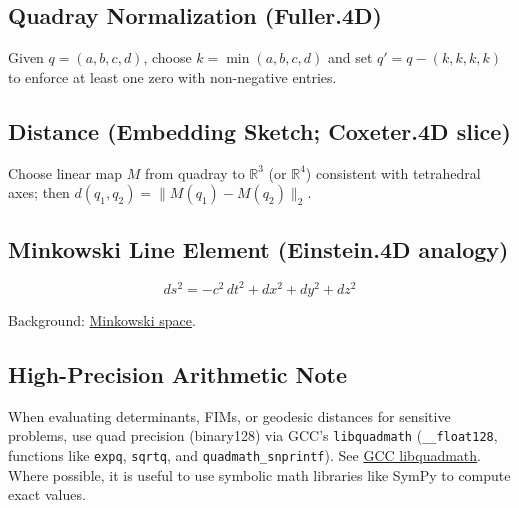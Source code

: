 \documentclass[
  10pt,
]{article}
\begin{document}
\hypertarget{quadray-normalization-fuller.4d}{%
\subsection{Quadray Normalization
(Fuller.4D)}\label{quadray-normalization-fuller.4d}}

Given \(q=(a,b,c,d)\), choose \(k=\min(a,b,c,d)\) and set
\(q' = q - (k,k,k,k)\) to enforce at least one zero with non-negative
entries.

\hypertarget{distance-embedding-sketch-coxeter.4d-slice}{%
\subsection{Distance (Embedding Sketch; Coxeter.4D
slice)}\label{distance-embedding-sketch-coxeter.4d-slice}}

Choose linear map \(M\) from quadray to \(\mathbb{R}^3\) (or
\(\mathbb{R}^4\)) consistent with tetrahedral axes; then
\(d(q_1,q_2) = \lVert M(q_1) - M(q_2) \rVert_2\).

\hypertarget{minkowski-line-element-einstein.4d-analogy}{%
\subsection{Minkowski Line Element (Einstein.4D
analogy)}\label{minkowski-line-element-einstein.4d-analogy}}

\begin{equation}\label{eq:supp_minkowski}
ds^2 = -c^2\,dt^2 + dx^2 + dy^2 + dz^2
\end{equation}

Background:
\href{https://en.wikipedia.org/wiki/Minkowski_space}{Minkowski space}.

\hypertarget{high-precision-arithmetic-note}{%
\subsection{High-Precision Arithmetic
Note}\label{high-precision-arithmetic-note}}

When evaluating determinants, FIMs, or geodesic distances for sensitive
problems, use quad precision (binary128) via GCC's \texttt{libquadmath}
(\texttt{\_\_float128}, functions like \texttt{expq}, \texttt{sqrtq},
and \texttt{quadmath\_snprintf}). See
\href{https://gcc.gnu.org/onlinedocs/libquadmath/index.html}{GCC
libquadmath}. Where possible, it is useful to use symbolic math
libraries like SymPy to compute exact values.
\end{document}
